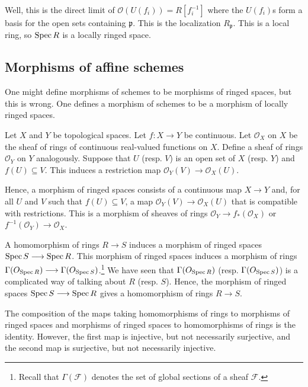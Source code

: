 \documentclass [11 pt, oneside] {article}
\begin{document}
Well, this is the direct limit of $\mathscr{O}(U({f_i}))= R[f_i ^{-1}]$ where the $U({f_i})$s form a basis for the open sets containing $\mathfrak{p}$. This is the localization $R_{\mathfrak{p}}$. This is a local ring, so $\operatorname{Spec} R$ is a locally ringed space.

\subsection{Morphisms of affine schemes}
One might define morphisms of schemes to be morphisms of ringed spaces, but this is wrong. One defines a morphism of schemes to be a morphism of locally ringed spaces. 

Let $X$ and $Y$ be topological spaces. Let $f:X\longrightarrow Y$ be continuous. Let $\mathscr{O}_X$ on $X$ be the sheaf of rings of continuous real-valued functions on $X$. Define a sheaf of rings $\mathscr{O}_Y$ on $Y$ analogously. Suppose that $U$ (resp. $V$) is an open set of $X$ (resp. $Y$) and $f(U)\subseteq V$. This induces a restriction map $\mathscr{O}_Y(V) \longrightarrow \mathscr{O}_X(U)$.

Hence, a morphism of ringed spaces consists of a continuous map $X\longrightarrow Y$ and, for all $U$ and $V$ such that $f(U)\subseteq V$, a map $\mathscr{O}_Y(V) \longrightarrow \mathscr{O}_X(U)$ that is compatible with restrictions. This is a morphism of sheaves of rings $\mathscr{O}_Y\longrightarrow f_*(\mathscr{O}_X)$ or $f^{-1}(\mathscr{O}_Y)\longrightarrow \mathscr{O}_X$.

A homomorphism of rings $R\longrightarrow S$ induces a morphism of ringed spaces $\operatorname{Spec} S \longrightarrow \operatorname{Spec} R$. This morphism of ringed spaces induces a morphism of rings $\Gamma(\relax{O}_{\operatorname{Spec} R})\longrightarrow \Gamma(\relax{O}_{\operatorname{Spec} S})$.\footnote{Recall that $\Gamma(\mathscr{F})$ denotes the set of global sections of a sheaf $\mathscr{F}$.} We have seen that $\Gamma(\relax{O}_{\operatorname{Spec} R})$ (resp. $\Gamma(\relax{O}_{\operatorname{Spec} S})$) is a complicated way of talking about $R$ (resp. $S$). Hence, the morphism of ringed spaces $\operatorname{Spec} S \longrightarrow \operatorname{Spec} R$ gives a homomorphism of rings $R\longrightarrow S$.

The composition of the maps taking homomorphisms of rings to morphisms of ringed spaces and morphisms of ringed spaces to homomorphisms of rings is the identity. However, the first map is injective, but not necessarily surjective, and the second map is surjective, but not necessarily injective.
\end{document}
